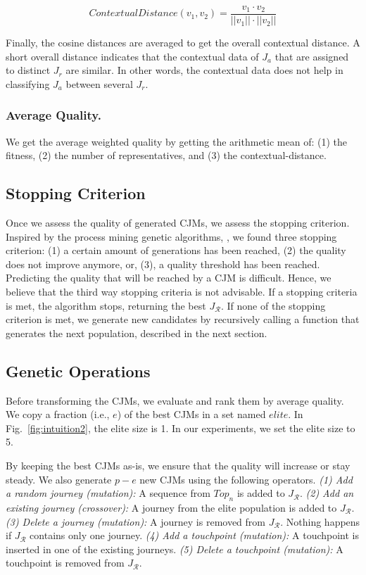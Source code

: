 \documentclass[runningheads]{llncs}
\begin{document}
{{\begin{equation}
    ContextualDistance({v_{1}}, {v_{2}}) = \frac{v_{1} \cdot v_{2}}{||v_{1} ||\cdot||v_{2}||} 
\end{equation}

Finally, the cosine distances are averaged to get the overall contextual distance. A short overall distance indicates that the contextual data of $J_a$ that are assigned to distinct $J_r$ are similar. In other words, the contextual data does not help in classifying $J_a$ between several $J_r$. 

\subsubsection{Average Quality.} We get the average weighted quality by getting the arithmetic mean of: (1) the fitness, (2) the number of representatives, and (3) the contextual-distance. 

\subsection{Stopping Criterion}
Once we assess the quality of generated CJMs, we assess the stopping criterion. Inspired by the process mining genetic algorithms, \cite{buijs2012genetic,de2005genetic}, we found three stopping criterion: (1) a certain amount of generations has been reached, (2) the quality does not improve anymore, or, (3), a quality threshold has been reached. Predicting the quality that will be reached by a CJM is difficult. Hence, we believe that the third way stopping criteria is not advisable. If a stopping criteria is met, the algorithm stops, returning the best $J_{\mathcal{R}}$. If none of the stopping criterion is met, we generate new candidates by recursively calling a function that generates the next population, described in the next section.

\subsection{Genetic Operations}
Before transforming the CJMs, we evaluate and rank them by average quality. We copy a fraction (i.e., $e$) of the best CJMs in a set named {$elite$}. In Fig.~\ref{fig:intuition2}, the elite size is 1. In our experiments, we set the elite size to 5. 

By keeping the best CJMs as-is, we ensure that the quality will increase or stay steady. We also generate $p-e$ new CJMs using the following operators. {\it (1) Add a random journey (mutation):} A sequence from $Top_n$ is added to $J_{\mathcal{R}}$. {\it (2) Add an existing journey (crossover):} A journey from the elite population is added to $J_{\mathcal{R}}$. {\it (3) Delete a journey (mutation):} A journey is removed from $J_{\mathcal{R}}$. Nothing happens if $J_{\mathcal{R}}$ contains only one journey. {\it (4) Add a touchpoint (mutation):} A touchpoint is inserted in one of the existing journeys. {\it (5) Delete a touchpoint (mutation):} A touchpoint is removed from $J_{\mathcal{R}}$. 

}}
\end{document}
